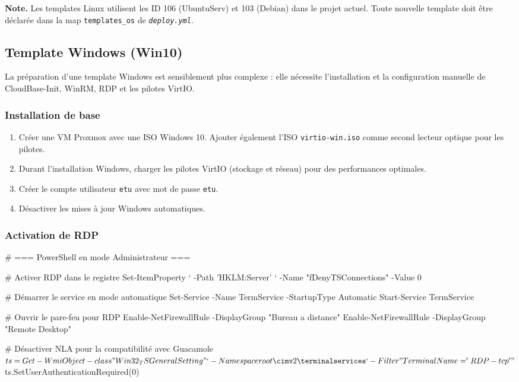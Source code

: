 \documentclass[a4paper]{article}
\newcommand{\cmd}[1]{\texttt{#1}}
\newcommand{\file}[1]{\texttt{\textit{#1}}}
\begin{document}
\begin{infobox}
  \textbf{Note.} Les templates Linux utilisent les ID 106 (UbuntuServ) et 103 (Debian) dans le projet actuel. Toute nouvelle template doit être déclarée dans la map \cmd{templates\_os} de \file{deploy.yml}.
\end{infobox}

\subsection{Template Windows (Win10)}

La préparation d'une template Windows est sensiblement plus complexe : elle nécessite l'installation et la configuration manuelle de CloudBase-Init, WinRM, RDP et les pilotes VirtIO.

\subsubsection*{Installation de base}

\begin{enumerate}
  \item Créer une VM Proxmox avec une ISO Windows 10. Ajouter également l'ISO \cmd{virtio-win.iso} comme second lecteur optique pour les pilotes.
  \item Durant l'installation Windows, charger les pilotes VirtIO (stockage et réseau) pour des performances optimales.
  \item Créer le compte utilisateur \cmd{etu} avec mot de passe \cmd{etu}.
  \item Désactiver les mises à jour Windows automatiques.
\end{enumerate}

\subsubsection*{Activation de RDP}

\begin{bashcode}
# === PowerShell en mode Administrateur ===

# Activer RDP dans le registre
Set-ItemProperty `
  -Path 'HKLM:\System\CurrentControlSet\Control\Terminal Server' `
  -Name "fDenyTSConnections" -Value 0

# Démarrer le service en mode automatique
Set-Service -Name TermService -StartupType Automatic
Start-Service TermService

# Ouvrir le pare-feu pour RDP
Enable-NetFirewallRule -DisplayGroup "Bureau a distance"
Enable-NetFirewallRule -DisplayGroup "Remote Desktop"

# Désactiver NLA pour la compatibilité avec Guacamole
$ts = Get-WmiObject -class "Win32_TSGeneralSetting" `
  -Namespace root\cimv2\terminalservices `
  -Filter "TerminalName='RDP-tcp'"
$ts.SetUserAuthenticationRequired(0)
\end{bashcode}
\end{document}
